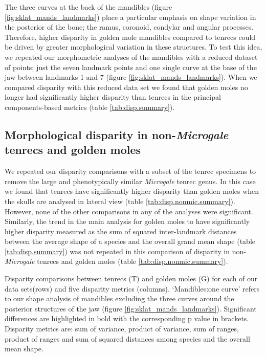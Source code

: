 \documentclass[12pt,a4paper]{article}
\begin{document}
	The three curves at the back of the mandibles (figure \ref{fig:sklat_mands_landmarks}) place a particular emphasis on shape variation in the posterior of the bone; the ramus, coronoid, condylar and angular processes. Therefore, higher disparity in golden mole mandibles compared to tenrecs could be driven by greater morphological variation in these structures. To test this idea, we repeated our morphometric analyses of the mandibles with a reduced dataset of points; just the seven landmark points and one single curve at the base of the jaw between landmarks 1 and 7 (figure \ref{fig:sklat_mands_landmarks}). When we compared disparity with this reduced data set we found that golden moles no longer had significantly higher disparity than tenrecs in the principal components-based metrics (table \ref{tab:disp.summary}).
	
\subsection{Morphological disparity in non-\textit{Microgale} tenrecs and golden moles} 	   
	We repeated our disparity comparisons with a subset of the tenrec specimens to remove the large and phenotypically similar \textit{Microgale} tenrec genus. In this case we found that tenrecs have significantly higher disparity than golden moles when the skulls are analysed in lateral view (table \ref{tab:disp.nonmic.summary}). However, none of the other comparisons in any of the analyses were significant. Similarly, the trend in the main analysis for golden moles to have significantly higher disparity measured as the sum of squared inter-landmark distances between the average shape of a species and the overall grand mean shape (table \ref{tab:disp.summary}) was not repeated in this comparison of disparity in non-\textit{Microgale} tenrecs and golden moles (table \ref{tab:disp.nonmic.summary}).



	\begin{table}[h]			
	\caption[Summary of disparity comparisons between tenrecs and golden moles]
		{Disparity comparisons between tenrecs (T) and golden moles (G) for each of our data sets(rows) and five disparity metrics (columns). `Mandibles:one curve' refers to our shape analysis of mandibles excluding the three curves around the posterior structures of the jaw (figure \ref{fig:sklat_mands_landmarks}). Significant differences are highlighted in bold with the corresponding p value in brackets. Disparity metrics are: sum of variance, product of variance, sum of ranges, product of ranges and sum of squared distances among species and the overall mean shape. }
	\centering
	 
	\label{tab:disp.summary}  
	\end{table}
\end{document}
